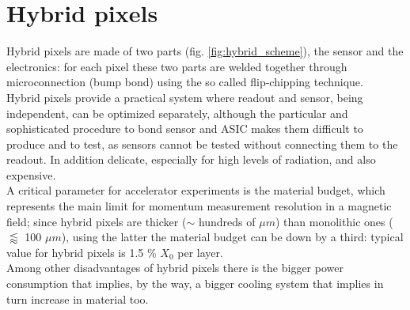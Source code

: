 \section{Hybrid pixels}
   Hybrid pixels are made of two parts (fig. \ref{fig:hybrid_scheme}), the sensor and the electronics: for each pixel these two parts are welded together through microconnection (bump bond) using the so called flip-chipping technique.\\  
   Hybrid pixels provide a practical system where readout and sensor, being independent, can be optimized separately, although the particular and sophisticated procedure to bond sensor and ASIC makes them difficult to produce and to test, as sensors cannot be tested without connecting them to the readout. In addition delicate, especially for high levels of radiation, and also expensive. \\
   A critical parameter for accelerator experiments is the material budget, which represents the main limit for momentum measurement resolution in a magnetic field; since hybrid pixels are thicker ($\sim$ hundreds of $\mu m$) than monolithic ones ($\lessapprox$ 100 $\mu m$), using the latter the material budget can be down by a third: typical value for hybrid pixels is 1.5 \% $X_0$ per layer.\\
   Among other disadvantages of hybrid pixels there is the bigger power consumption that implies, by the way, a bigger cooling system that implies in turn increase in material too.

